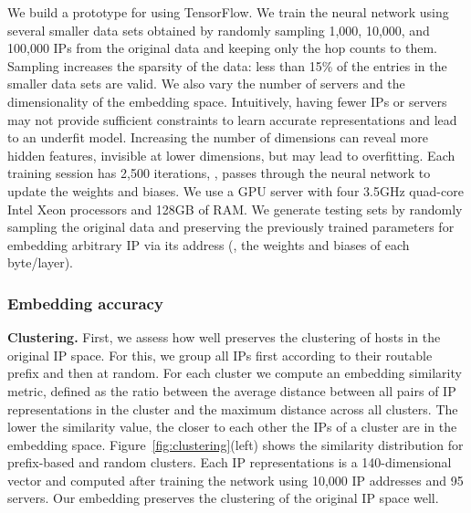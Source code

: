 We build a prototype for \system{} using TensorFlow. We train the neural network using several smaller data sets obtained by randomly sampling 1,000, 10,000, and 100,000 IPs from the original data and keeping only the hop counts to them. Sampling increases the sparsity of the data: less than 15\% of the entries in the smaller data sets are valid. We also vary the number of servers and the dimensionality of the embedding space. Intuitively, having fewer IPs or servers may not provide sufficient constraints to learn accurate representations and lead to an underfit model. Increasing the number of dimensions can reveal more hidden features, invisible at lower dimensions, but may lead to overfitting. Each training session has 2,500 iterations, \ie{}, passes through the neural network to update the weights and biases. We use a GPU server with four 3.5GHz quad-core Intel Xeon processors and 128GB of RAM. We generate testing sets by randomly sampling the original data and preserving the previously trained parameters for embedding arbitrary IP via its address (\eg{}, the weights and biases of each byte/layer).


\subsubsection{Embedding accuracy}

\textbf{Clustering.} First, we assess how well \system{} preserves the clustering of hosts in the original IP space. For this, we group all IPs first according to their routable prefix and then at random. For each cluster we compute an embedding similarity metric, defined as the ratio between the average distance between all pairs of IP representations in the cluster and the maximum distance across all clusters. The lower the similarity value, the closer to each other the IPs of a cluster are in the embedding space. Figure~\ref{fig:clustering}(left) shows the similarity distribution for prefix-based and random clusters. Each IP representations is a 140-dimensional vector and computed after training the network using 10,000 IP addresses and 95 servers. Our embedding preserves the clustering of the original IP space well. 

